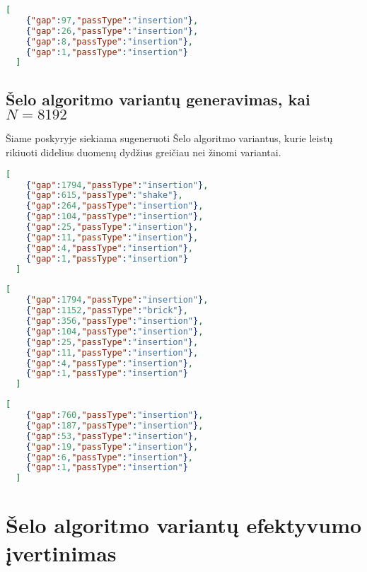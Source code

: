 \documentclass{VUMIFInfBakalaurinis}
\begin{document}
\begin{lstlisting}[caption={Algoritmas B3},label={alg:B3},language=json]
  [
    {"gap":97,"passType":"insertion"}, 
    {"gap":26,"passType":"insertion"}, 
    {"gap":8,"passType":"insertion"}, 
    {"gap":1,"passType":"insertion"}
  ]
\end{lstlisting}

\subsection{Šelo algoritmo variantų generavimas, kai $N = 8192$}

Šiame poskyryje siekiama sugeneruoti Šelo algoritmo variantus,
kurie leistų rikiuoti didelius duomenų dydžius greičiau nei žinomi variantai.

\begin{lstlisting}[caption={Algoritmas C1},label={alg:C1},language=json]
  [
    {"gap":1794,"passType":"insertion"}, 
    {"gap":615,"passType":"shake"}, 
    {"gap":264,"passType":"insertion"}, 
    {"gap":104,"passType":"insertion"}, 
    {"gap":25,"passType":"insertion"}, 
    {"gap":11,"passType":"insertion"}, 
    {"gap":4,"passType":"insertion"}, 
    {"gap":1,"passType":"insertion"}
  ]
\end{lstlisting}

\begin{lstlisting}[caption={Algoritmas C2},label={alg:C2},language=json]
  [
    {"gap":1794,"passType":"insertion"}, 
    {"gap":1152,"passType":"brick"}, 
    {"gap":356,"passType":"insertion"}, 
    {"gap":104,"passType":"insertion"}, 
    {"gap":25,"passType":"insertion"}, 
    {"gap":11,"passType":"insertion"}, 
    {"gap":4,"passType":"insertion"}, 
    {"gap":1,"passType":"insertion"}
  ]
\end{lstlisting}

\begin{lstlisting}[caption={Algoritmas C3},label={alg:C3},language=json]
  [
    {"gap":760,"passType":"insertion"}, 
    {"gap":187,"passType":"insertion"}, 
    {"gap":53,"passType":"insertion"}, 
    {"gap":19,"passType":"insertion"}, 
    {"gap":6,"passType":"insertion"}, 
    {"gap":1,"passType":"insertion"}
  ]
\end{lstlisting}


\section{Šelo algoritmo variantų efektyvumo įvertinimas}
\end{document}
